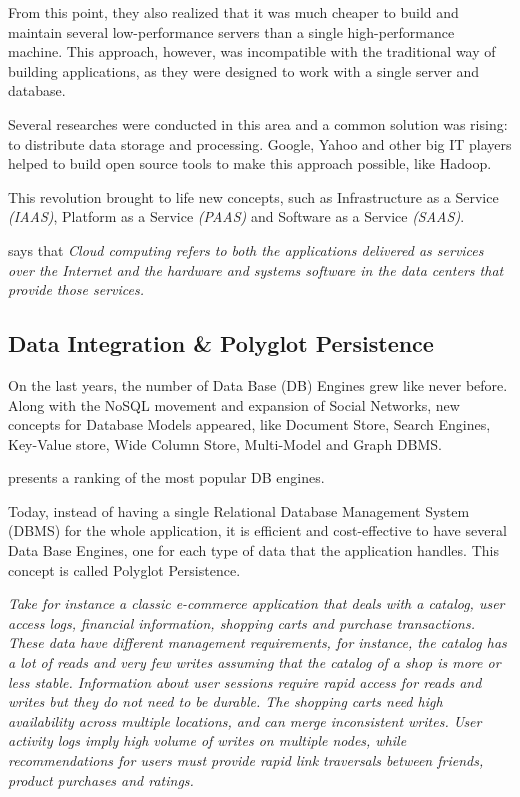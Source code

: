 \documentclass{article}
\begin{document}
From this point, they also realized that it was much cheaper to build and maintain several low-performance servers than a single high-performance machine. This approach, however, was incompatible with the traditional way of building applications, as they were designed to work with a single server and database. 

Several researches were conducted in this area and a common solution was rising: to distribute data storage and processing. Google, Yahoo and other big IT players helped to build open source tools to make this approach possible, like Hadoop.

This revolution brought to life new concepts, such as Infrastructure as a Service \textit{(IAAS)}, Platform as a Service \textit{(PAAS)} and Software as a Service \textit{(SAAS)}. 

\cite{AViewOfCloudComputing} says that \textit{Cloud computing refers to both the applications delivered as services over the Internet and the hardware and systems software in the data centers that provide those services.} 


\subsection{Data Integration \& Polyglot Persistence}
On the last years, the number of Data Base (DB) Engines grew like never before. Along with the NoSQL movement and expansion of Social Networks, new concepts for Database Models appeared, like Document Store, Search Engines, Key-Value store, Wide Column Store, Multi-Model and Graph DBMS. 

\cite{dbranking} presents a ranking of the most popular DB engines.


Today, instead of having a single Relational Database Management System (DBMS) for the whole application, it is efficient and cost-effective to have several Data Base Engines, one for each type of data that the application handles. This concept is called Polyglot Persistence.


\textit{Take for instance a classic e-commerce application that deals with a catalog, user access logs, financial information, shopping carts and purchase transactions. These data have different management requirements, for instance, the catalog has a lot of reads and very few writes assuming that the catalog of a shop is more or less stable. Information about user sessions require rapid access for reads and writes but they do not need to be durable. The shopping carts need high availability across multiple locations, and can merge inconsistent writes. User activity logs imply high volume of writes on multiple nodes, while recommendations for users must provide rapid link traversals between friends, product purchases and ratings.} \cite{AdressingDataManagementCloud}
\end{document}
